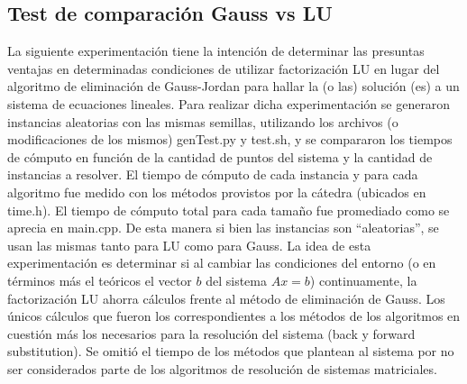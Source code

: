 \subsection{Test de comparación Gauss vs LU}
La siguiente experimentación tiene la intención de determinar las presuntas ventajas en determinadas condiciones de utilizar factorización LU en lugar del algoritmo de eliminación de Gauss-Jordan para hallar la (o las) solución (es) a un sistema de ecuaciones lineales. Para realizar dicha experimentación se generaron instancias aleatorias con las mismas semillas, utilizando los archivos (o modificaciones de los mismos) genTest.py y test.sh, y se compararon los tiempos de cómputo en función de la cantidad de puntos del sistema y la cantidad de instancias a resolver. El tiempo de cómputo de cada instancia y para cada algoritmo fue medido con los métodos provistos por la cátedra (ubicados en time.h). El tiempo de cómputo total para cada tamaño fue promediado como se aprecia en main.cpp. De esta manera si bien las instancias son ``aleatorias'', se usan las mismas tanto para LU como para Gauss. La idea de esta experimentación es determinar si al cambiar las condiciones del entorno (o en términos más el teóricos el vector $b$ del sistema $Ax=b$) continuamente, la factorización LU ahorra cálculos frente al método de eliminación de Gauss. Los únicos cálculos que fueron los correspondientes a los métodos de los algoritmos en cuestión más los necesarios para la resolución del sistema (back y forward substitution). Se omitió el tiempo de los métodos que plantean al sistema por no ser considerados parte de los algoritmos de resolución de sistemas matriciales.
